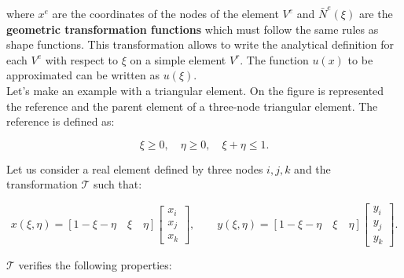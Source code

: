 	where $x^e$ are the coordinates of the nodes of the element $V^e$ and $\bar{N}^e(\xi)$ are the \textbf{geometric transformation functions} which must follow the same rules as shape functions. This transformation allows to write the analytical definition for each $V^e$ with respect to $\xi$ on a simple element $V^r$. The function $u(x)$ to be approximated can be written as $u(\xi)$. \\
	
	Let's make an example with a triangular element. On the figure is represented the reference and the parent element of a three-node triangular element. The reference is defined as:
	
	\begin{equation}
	\xi \geq 0, \quad \eta \geq 0, \quad \xi + \eta \leq 1.
	\end{equation}
	
	\newpage
	Let us consider a real element defined by three nodes $i, j, k$ and the transformation $\mathcal{T}$ such that: 
	
	\begin{equation}
	x(\xi, \eta) = [1-\xi - \eta \quad \xi \quad \eta] 
	\left[
	\begin{array}{c}
	x_i\\
	x_j\\
	x_k
	\end{array}
	\right], 
	\qquad 
	y(\xi, \eta) = [1-\xi - \eta \quad \xi \quad \eta] 
	\left[
	\begin{array}{c}
	y_i\\
	y_j\\
	y_k
	\end{array}
	\right].
	\end{equation}
	
	$\mathcal{T}$ verifies the following properties:
	
